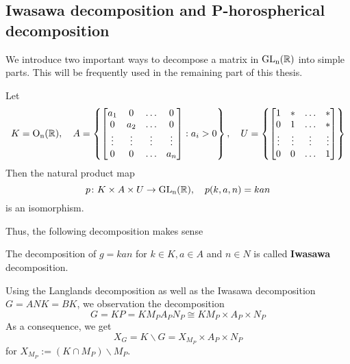 \subsection{Iwasawa decomposition and P-horospherical decomposition}
We introduce two important ways to decompose a matrix in $\operatorname{\text{GL}_n(\mathbb{R})}$ into simple parts. This will be frequently used
in the remaining part of this thesis.
\begin{prop}
    Let \begin{align*}
        K=\operatorname{O_n(\mathbb{R})}, \quad A = \left\lbrace\begin{bmatrix}
                                         a_1    & 0      & \ldots & 0      \\
                                         0      & a_2    & \ldots & 0      \\
                                         \vdots & \vdots & \vdots & \vdots \\
                                         0      & 0      & \ldots & a_n
                                     \end{bmatrix}: a_i >0\right\rbrace, \quad
        U = \left\lbrace  \begin{bmatrix}
                              1      & \ast   & \ldots & \ast   \\
                              0      & 1      & \ldots & \ast   \\
                              \vdots & \vdots & \vdots & \vdots \\
                              0      & 0      & \ldots & 1\end{bmatrix}
        \right\rbrace
    \end{align*}
    Then the natural product map \[p \colon K \times A \times U \to \operatorname{\text{GL}_n(\mathbb{R})}, \quad p(k,a,n)=kan\]
    is an isomorphism.
\end{prop}
Thus, the following decomposition makes sense
\begin{definition}
    The decomposition of $g = kan$ for $k \in K, a \in A$ and $n \in N$ is called \textbf{Iwasawa} decomposition.
\end{definition}
Using the Langlands decomposition as well as the Iwasawa decomposition $G= ANK = BK$, we observation
the decomposition
\[G = KP = KM_PA_PN_P \cong KM_P\times A_P\times N_P\]
As a consequence, we get
\[X_G  = K\backslash G = X_{M_P} \times A_P \times N_P\]
for $X_{M_P} := (K\cap M_P) \backslash M_{P}$.

